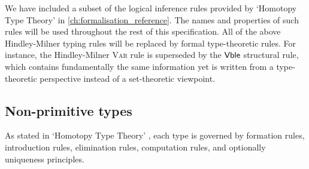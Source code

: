 \documentclass[UKenglish, 11pt, a4paper, parskip=half]{scrbook}
\begin{document}


\iffalse{}

We have included a subset of the logical inference rules provided by `Homotopy Type Theory' \cite{hottbook} in \cref{ch:formalisation_reference}.
The names and properties of such rules will be used throughout the rest of this specification.
All of the above Hindley-Milner typing rules will be replaced by formal type-theoretic rules.
For instance, the Hindley-Milner \textsc{Var} rule is superseded by the \(\mathsf{Vble}\) structural rule, which contains fundamentally the same information yet is written from a type-theoretic perspective instead of a set-theoretic viewpoint.

\subsection{Non-primitive types}

As stated in `Homotopy Type Theory' \cite{hottbook}, each type is governed by formation rules, introduction rules, elimination rules, computation rules, and optionally uniqueness principles.
\end{document}

